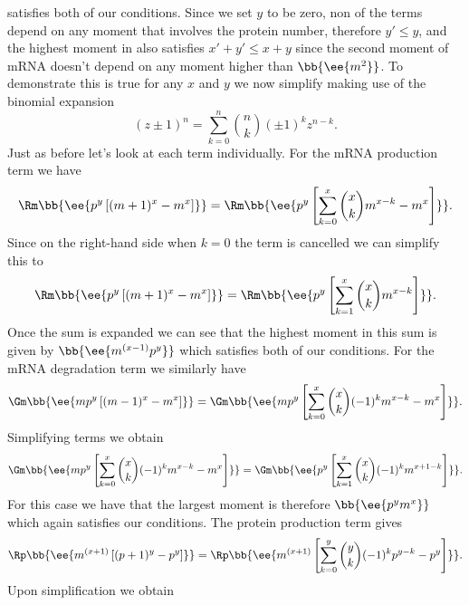  satisfies both of our conditions. Since we set $y$ to
be zero, non of the terms depend on any moment that involves the protein number,
therefore $y' \leq y$, and the highest moment in  also
satisfies $x' + y' \leq x + y$ since the second moment of mRNA doesn't depend
on any moment higher than $\bb{\ee{m^2}}$. To demonstrate this is true for any
$x$ and $y$ we now simplify  making use of the
binomial expansion
\begin{equation}
  (z \pm 1)^n = \sum_{k=0}^n {n \choose k} (\pm 1)^{k} z^{n-k}.
\end{equation}
Just as before let's look at each term individually. For the mRNA production
term we have
\begin{equation}
  \Rm \bb{\ee{p^y \left[ (m + 1)^x -m^x \right]}} =
  \Rm \bb{\ee{p^y \left[ \sum_{k=0}^x {x \choose k} m^{x-k} - m^x \right]}}.
\end{equation}
Since on the right-hand side when $k=0$ the term is cancelled we can simplify
this to
\begin{equation}
  \Rm \bb{\ee{p^y \left[ (m + 1)^x -m^x \right]}} =
  \Rm \bb{\ee{p^y \left[ \sum_{k=1}^x {x \choose k} m^{x-k} \right]}}.
\end{equation}
Once the sum is expanded we can see that the highest moment in this sum is given
by $\bb{\ee{m^{(x-1)} p^y}}$ which satisfies both of our conditions. For the
mRNA degradation term we similarly have
\begin{equation}
  \Gm \bb{\ee{m p^y \left[ (m - 1)^x - m^x \right]}} =
  \Gm \bb{\ee{m p^y \left[ \sum_{k=0}^x {x \choose k}(-1)^k m^{x-k} -
                          m^x \right]}}.
\end{equation}
Simplifying terms we obtain
\begin{equation}
  \Gm \bb{\ee{m p^y \left[ \sum_{k=0}^x {x \choose k}(-1)^k m^{x-k} -
                          m^x \right]}} =
  \Gm \bb{\ee{p^y \left[ \sum_{k=1}^x {x \choose k}(-1)^k m^{x+1-k} \right]}}.
\end{equation}
For this case we have that the largest moment is therefore $\bb{\ee{p^y m^x}}$
which again satisfies our conditions. The protein production term gives
\begin{equation}
  \Rp \bb{\ee{m^{(x + 1)} \left[ (p + 1)^y - p^y \right]}} =
  \Rp \bb{\ee{m^{(x + 1)} \left[ \sum_{k=0}^y {y \choose k} (-1)^k p^{y-k}
                                - p^y \right]}}.
\end{equation}
Upon simplification we obtain
